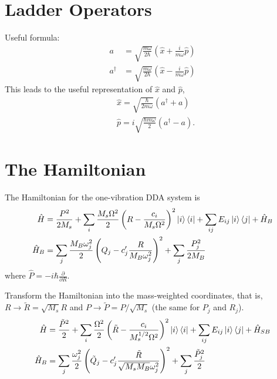 \documentclass{article}
\begin{document}
\section*{Ladder Operators}

Useful formula:
$$
\begin{aligned}
	a &=\sqrt{\frac{m \omega}{2 \hbar}}\left(\hat{x}+\frac{i}{m \omega} \hat{p}\right) \\
	a^{\dagger} &=\sqrt{\frac{m \omega}{2 \hbar}}\left(\hat{x}-\frac{i}{m \omega} \hat{p}\right)
\end{aligned}
$$
This leads to the useful representation of $\hat{x}$ and $\hat{p}$,
$$
\begin{aligned}
	&\hat{x}=\sqrt{\frac{\hbar}{2 m \omega}}\left(a^{\dagger}+a\right) \\
	&\hat{p}=i \sqrt{\frac{\hbar m \omega}{2}}\left(a^{\dagger}-a\right).
\end{aligned}
$$

\section*{The Hamiltonian}
The Hamiltonian for the one-vibration DDA system is
\begin{align*}
	\hat{H}&=\frac{P^{2}}{2 M_s}+\sum_{i} \frac{M_{s} \Omega^{2}}{2} \left(R-\frac{c_{i}}{M_{s} \Omega^{2}}\right)^{2}\ket{i}\bra{i}+\sum_{ij}E_{ij}\ket{i}\bra{j}+\hat{H}_{B}\\
	\hat{H}_{B}&=\sum_j \frac{M_{B} \omega_{j}^{2}}{2} \left(Q_{j}-c^{\prime}_{j} \frac{R}{M_{B} \omega_{j}^{2}}\right)^{2} + \sum_j\frac{P_j^2}{2M_B}
\end{align*}
where $\hat{P}=-i\hbar\frac{\partial}{\partial R}$.

Transform the Hamiltonian into the mass-weighted coordinates, that is, $R\to \tilde{R}=\sqrt{M_s}R$ and $P\to \tilde{P}=P/\sqrt{M_s}$ (the same for $P_j$ and $R_j$).
\begin{align*}
	\hat{H} &= \frac{\tilde{P}^{2}}{2}
	+\sum_{i} \frac{\Omega^{2}}{2} \left(\tilde{R}-\frac{c_{i}}{M_{s}^{1/2} \Omega^{2}}\right)^{2}\ket{i}\bra{i}
	+\sum_{ij}E_{ij}\ket{i}\bra{j}+\hat{H}_{S B}\\
	\hat{H}_{B} &= \sum_j \frac{\omega_{j}^{2}}{2} \left(\tilde{Q}_{j}-c^{\prime}_{j} \frac{\tilde{R}}{\sqrt{M_sM_{B}} \omega_{j}^{2}}\right)^{2} + \sum_j\frac{\tilde{P}_j^2}{2}
\end{align*}
\end{document}
